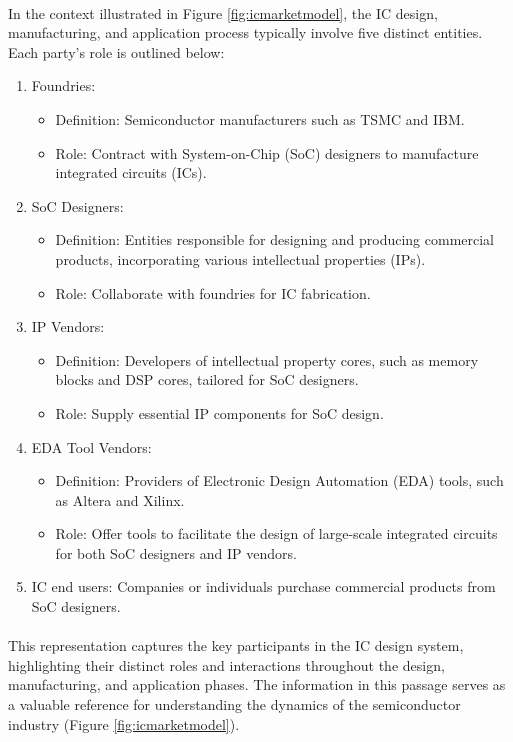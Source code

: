 \paragraph*{}
In the context illustrated in Figure \ref{fig:icmarketmodel}, the IC design, manufacturing, and application process typically involve five distinct entities. Each party's role is outlined below:
\begin{enumerate}
	\item Foundries: \begin{itemize}
		\item Definition: Semiconductor manufacturers such as TSMC and IBM.
		\item Role: Contract with System-on-Chip (SoC) designers to manufacture integrated circuits (ICs).
	\end{itemize}
	\item SoC Designers: \begin{itemize}
		\item Definition: Entities responsible for designing and producing commercial products, incorporating various intellectual properties (IPs).
		\item Role: Collaborate with foundries for IC fabrication.
	\end{itemize}
	\item IP Vendors: \begin{itemize}
		\item Definition: Developers of intellectual property cores, such as memory blocks and DSP cores, tailored for SoC designers.
		\item Role: Supply essential IP components for SoC design.
	\end{itemize}
	\item EDA Tool Vendors: \begin{itemize}
		\item Definition: Providers of Electronic Design Automation (EDA) tools, such as Altera and Xilinx.
		\item Role: Offer tools to facilitate the design of large-scale integrated circuits for both SoC designers and IP vendors.
	\end{itemize}
	\item IC end users:
	Companies or individuals purchase commercial products from SoC designers.
\end{enumerate}
\paragraph*{}
This representation captures the key participants in the IC design system, highlighting their distinct roles and interactions throughout the design, manufacturing, and application phases. The information in this passage serves as a valuable reference for understanding the dynamics of the semiconductor industry (Figure \ref{fig:icmarketmodel}).


